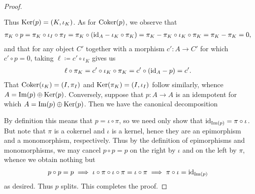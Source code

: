 \begin{proof}
\begin{align*}
\begin{split}
\end{split}
\end{align*}
\noindent Thus $\textup{Ker}(p) = (K, \iota_K)$. As for $\textup{Coker}(p)$, we observe that
\begin{align*}
\begin{split}
\pi_K \circ p = \pi_K \circ \iota_I \circ \pi_I = \pi_K \circ (\textup{id}_A - \iota_K \circ \pi_K) = \pi_K - \pi_K \circ \iota_K \circ \pi_K = \pi_K - \pi_K = 0,
\end{split}
\end{align*}
\noindent and that for any object $C'$ together with a morphism $c' : A \to C'$ for which $c' \circ p = 0$, taking $\ell \coloneqq c' \circ \iota_K$ gives us
\begin{align*}
\begin{split}
\ell \circ \pi_K = c' \circ \iota_K \circ \pi_K = c' \circ (\textup{id}_A - p) = c'.
\end{split}
\end{align*}
\noindent That $\textup{Coker}(\iota_K) = (I, \pi_I)$ and $\textup{Ker}(\pi_K) = (I, \iota_I)$ follow similarly, whence $A = \textup{Im}(p) \oplus \textup{Ker}(p)$.\newpage%
\noindent Conversely, suppose that $p : A \to A$ is an idempotent for which $A = \textup{Im}(p) \oplus \textup{Ker}(p)$. Then we have the canonical decomposition
\begin{center}
\end{center}
\noindent By definition this means that $p = \iota \circ \pi$, so we need only show that $\textup{id}_{\textup{Im}(p)} = \pi \circ \iota$. But note that $\pi$ is a cokernel and $\iota$ is a kernel, hence they are an epimorphism and a monomorphism, respectively. Thus by the definition of epimorphisms and monomorphisms, we may cancel $p \circ p = p$ on the right by $\iota$ and on the left by $\pi$, whence we obtain nothing but
\begin{align*}
\begin{split}
p \circ p = p \implies \iota \circ \pi \circ \iota \circ \pi = \iota \circ \pi \implies \pi \circ \iota = \textup{id}_{\textup{Im}(p)}
\end{split}
\end{align*}
\noindent as desired. Thus $p$ splits. This completes the proof.
\end{proof}\\

